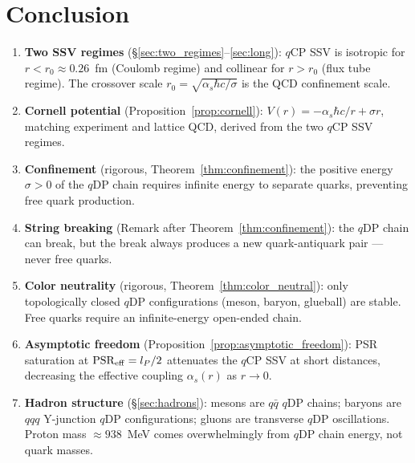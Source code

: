 \documentclass[12pt]{article}
\newcommand{\lP}{l_P}
\newcommand{\PSR}{\mathrm{PSR}}
\newcommand{\qCP}{q\mathrm{CP}}
\newcommand{\qDP}{q\mathrm{DP}}
\newcommand{\as}{\alpha_s}
\begin{document}
\section{Conclusion}
\label{sec:conclusion}

\begin{enumerate}
\item \textbf{Two SSV regimes} (§\ref{sec:two_regimes}--\ref{sec:long}):
  $\qCP$ SSV is isotropic for $r < r_0 \approx 0.26$~fm
  (Coulomb regime) and collinear for $r > r_0$ (flux tube regime).
  The crossover scale $r_0 = \sqrt{\as\hbar c/\sigma}$ is the
  QCD confinement scale.

\item \textbf{Cornell potential} (Proposition~\ref{prop:cornell}):
  $V(r) = -\as\hbar c/r + \sigma r$, matching experiment and
  lattice QCD, derived from the two $\qCP$ SSV regimes.

\item \textbf{Confinement} (rigorous, Theorem~\ref{thm:confinement}):
  the positive energy $\sigma > 0$ of the $\qDP$ chain requires
  infinite energy to separate quarks, preventing free quark
  production.

\item \textbf{String breaking} (Remark after Theorem~\ref{thm:confinement}):
  the $\qDP$ chain can break, but the break always produces a new
  quark-antiquark pair — never free quarks.

\item \textbf{Color neutrality} (rigorous, Theorem~\ref{thm:color_neutral}):
  only topologically closed $\qDP$ configurations (meson, baryon,
  glueball) are stable. Free quarks require an infinite-energy
  open-ended chain.

\item \textbf{Asymptotic freedom} (Proposition~\ref{prop:asymptotic_freedom}):
  PSR saturation at $\PSR_{\rm eff} = \lP/2$ attenuates the
  $\qCP$ SSV at short distances, decreasing the effective coupling
  $\as(r)$ as $r \to 0$.

\item \textbf{Hadron structure} (§\ref{sec:hadrons}): mesons are
  $q\bar q$ $\qDP$ chains; baryons are $qqq$ Y-junction $\qDP$
  configurations; gluons are transverse $\qDP$ oscillations.
  Proton mass $\approx 938$~MeV comes overwhelmingly from $\qDP$
  chain energy, not quark masses.
\end{enumerate}
\end{document}

